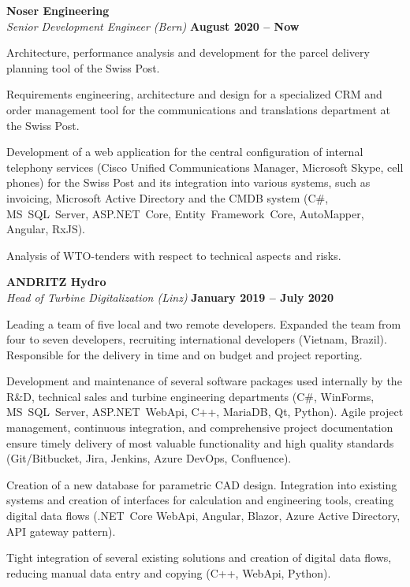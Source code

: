 \documentclass[line,11pt,a4paper]{resume}
\begin{document}
\begin{resume}
\textbf{Noser Engineering}\\\vspace{1mm}%
\textsl{Senior Development Engineer (Bern)}
  \hfill \textbf{August 2020 -- Now}\\
\vspace{-4mm}%
\begin{list2}
  \item Architecture, performance analysis and development for the parcel
    delivery planning tool of the Swiss Post.
  \item Requirements engineering, architecture and design for a specialized
    CRM and order management tool for the communications and translations
    department at the Swiss Post.
  \item Development of a web application for the central configuration of
    internal telephony services (Cisco Unified Communications Manager,
    Microsoft Skype, cell phones) for the Swiss Post and its integration into
    various systems, such as invoicing, Microsoft Active Directory and the
    CMDB system (C\#, MS~SQL~Server, ASP.NET~Core, Entity~Framework~Core,
    AutoMapper, Angular, RxJS).
  \item Analysis of WTO-tenders with respect to technical aspects and risks.
\end{list2}

\textbf{ANDRITZ Hydro}\\\vspace{1mm}%
\textsl{Head of Turbine Digitalization (Linz)}
  \hfill \textbf{January 2019 -- July 2020}\\
\vspace{-4mm}%
\begin{list2}
  \item Leading a team of five local and two remote developers. Expanded the
    team from four to seven developers, recruiting international developers
    (Vietnam, Brazil). Responsible for the delivery in time and on budget and
    project reporting.
  \item Development and maintenance of several software packages used
    internally by the R\&D, technical sales and turbine engineering
    departments (C\#, WinForms, MS~SQL~Server, ASP.NET~WebApi, C++, MariaDB,
    Qt, Python). Agile project management, continuous integration, and
    comprehensive project documentation ensure timely delivery of most valuable
    functionality and high quality standards (Git/Bitbucket, Jira, Jenkins,
    Azure DevOps, Confluence).
  \item Creation of a new database for parametric CAD design. Integration into
    existing systems and creation of interfaces for calculation and engineering
    tools, creating digital data flows (.NET~Core WebApi, Angular, Blazor,
    Azure Active Directory, API gateway pattern).
  \item Tight integration of several existing solutions and creation of digital
    data flows, reducing manual data entry and copying (C++, WebApi, Python).
\end{list2}


\end{resume}
\end{document}
